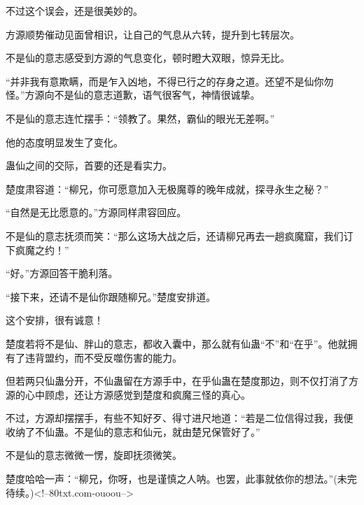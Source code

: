\begin{this_body}
不过这个误会，还是很美妙的。

方源顺势催动见面曾相识，让自己的气息从六转，提升到七转层次。

不是仙的意志感受到方源的气息变化，顿时瞪大双眼，惊异无比。

“并非我有意欺瞒，而是乍入凶地，不得已行之的存身之道。还望不是仙你勿怪。”方源向不是仙的意志道歉，语气很客气，神情很诚挚。

不是仙的意志连忙摆手：“领教了。果然，霸仙的眼光无差啊。”

他的态度明显发生了变化。

蛊仙之间的交际，首要的还是看实力。

楚度肃容道：“柳兄，你可愿意加入无极魔尊的晚年成就，探寻永生之秘？”

“自然是无比愿意的。”方源同样肃容回应。

不是仙的意志抚须而笑：“那么这场大战之后，还请柳兄再去一趟疯魔窟，我们订下疯魔之约！”

“好。”方源回答干脆利落。

“接下来，还请不是仙你跟随柳兄。”楚度安排道。

这个安排，很有诚意！

楚度若将不是仙、胖山的意志，都收入囊中，那么就有仙蛊“不”和“在乎”。他就拥有了违背盟约，而不受反噬伤害的能力。

但若两只仙蛊分开，不仙蛊留在方源手中，在乎仙蛊在楚度那边，则不仅打消了方源的心中顾虑，还让方源感觉到楚度和疯魔三怪的真心。

不过，方源却摆摆手，有些不知好歹、得寸进尺地道：“若是二位信得过我，我便收纳了不仙蛊。不是仙的意志和仙元，就由楚兄保管好了。”

不是仙的意志微微一愣，旋即抚须微笑。

楚度哈哈一声：“柳兄，你呀，也是谨慎之人呐。也罢，此事就依你的想法。”(未完待续。)<!--80txt.com-ouoou-->

\end{this_body}

